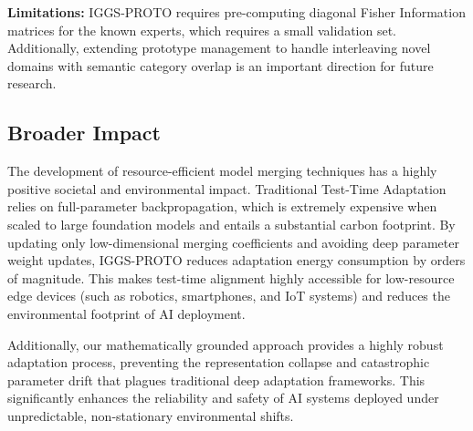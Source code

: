 \documentclass{article}
\theoremstyle{plain}
\theoremstyle{definition}
\theoremstyle{remark}
\begin{document}
\textbf{Limitations:} IGGS-PROTO requires pre-computing diagonal Fisher Information matrices for the known experts, which requires a small validation set. Additionally, extending prototype management to handle interleaving novel domains with semantic category overlap is an important direction for future research.

\subsection{Broader Impact}
The development of resource-efficient model merging techniques has a highly positive societal and environmental impact. Traditional Test-Time Adaptation relies on full-parameter backpropagation, which is extremely expensive when scaled to large foundation models and entails a substantial carbon footprint. By updating only low-dimensional merging coefficients and avoiding deep parameter weight updates, IGGS-PROTO reduces adaptation energy consumption by orders of magnitude. This makes test-time alignment highly accessible for low-resource edge devices (such as robotics, smartphones, and IoT systems) and reduces the environmental footprint of AI deployment.

Additionally, our mathematically grounded approach provides a highly robust adaptation process, preventing the representation collapse and catastrophic parameter drift that plagues traditional deep adaptation frameworks. This significantly enhances the reliability and safety of AI systems deployed under unpredictable, non-stationary environmental shifts.

\nocite{*}



\newpage
\appendix
\onecolumn
{}
\end{document}
